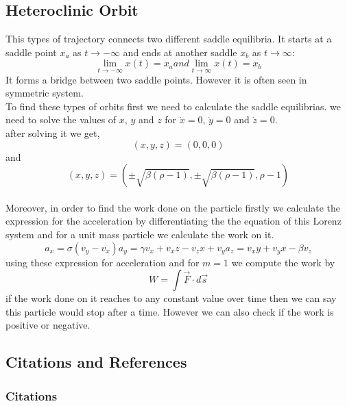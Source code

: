 \documentclass[%
reprint,
amsmath,amssymb,
aps,
floatfix,
]{revtex4-2}
\begin{document}
	\subsection{Heteroclinic Orbit}
	This types of trajectory connects two different saddle equilibria. It starts at a saddle point $x_a$ as $t\to-\infty$ and ends at another saddle $x_b$ as $t\to\infty$:
	\begin{equation}
		\lim_{t\to-\infty}x(t)= x_a	  and   \lim_{t\to\infty}x(t)= x_b
	\end{equation}
	It forms a bridge between two saddle points. However it is often seen in symmetric system.\\
	To find these types of orbits first we need to calculate the saddle equilibrias. we need to solve the values of $x$, $y$ and $z$ for $\dot{x}=0$, $\dot{y}=0$ and $\dot{z}=0$.\\
	after solving it we get,\\
	\begin{equation}
		(x,y,z) = (0,0,0)
	\end{equation}
	and
	\begin{equation}
		(x,y,z) = (\pm \sqrt{\beta(\rho -1)}, \pm \sqrt{\beta(\rho -1)}, \rho -1)
	\end{equation}
	\\
	Moreover, in order to find the work done on the particle firstly we calculate the expression for the acceleration by differentiating the the equation of this Lorenz system and for a unit mass particle we calculate the work on it.
	\begin{equation}
		a_x = \sigma(v_y - v_x)
		a_y = \gamma v_x + v_x z - v_z x +v_y
		a_z = v_x y + v_y x - \beta v_z
	\end{equation} 
	using these expression for acceleration and for $m=1$ we compute the work by
	\begin{equation}
		W= \int \vec{F} \cdot d\vec{s}
	\end{equation}
	if the work done on it reaches to any constant value over time then we can say this particle would stop after a time. However we can also check if the work is positive or negative.
	\subsection{\label{sec:citeref}Citations and References}
	
	
	\subsubsection{Citations}
	
\end{document}
